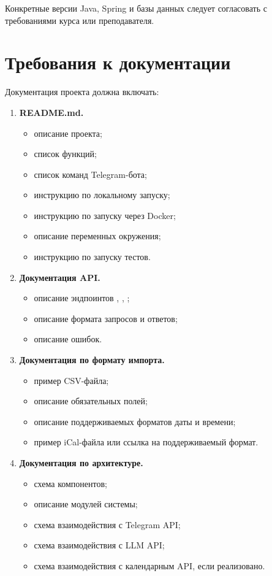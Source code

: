 \documentclass[10pt,a4paper,final]{article} %
\begin{document}
Конкретные версии Java, Spring и базы данных следует согласовать с требованиями курса или преподавателя.

\section{Требования к документации}

Документация проекта должна включать:

\begin{enumerate}
    \item \textbf{README.md.}
    \begin{itemize}
        \item описание проекта;
        \item список функций;
        \item список команд Telegram-бота;
        \item инструкцию по локальному запуску;
        \item инструкцию по запуску через Docker;
        \item описание переменных окружения;
        \item инструкцию по запуску тестов.
    \end{itemize}

    \item \textbf{Документация API.}
    \begin{itemize}
        \item описание эндпоинтов , , ;
        \item описание формата запросов и ответов;
        \item описание ошибок.
    \end{itemize}

    \item \textbf{Документация по формату импорта.}
    \begin{itemize}
        \item пример CSV-файла;
        \item описание обязательных полей;
        \item описание поддерживаемых форматов даты и времени;
        \item пример iCal-файла или ссылка на поддерживаемый формат.
    \end{itemize}

    \item \textbf{Документация по архитектуре.}
    \begin{itemize}
        \item схема компонентов;
        \item описание модулей системы;
        \item схема взаимодействия с Telegram API;
        \item схема взаимодействия с LLM API;
        \item схема взаимодействия с календарным API, если реализовано.
    \end{itemize}
\end{enumerate}
\end{document}
